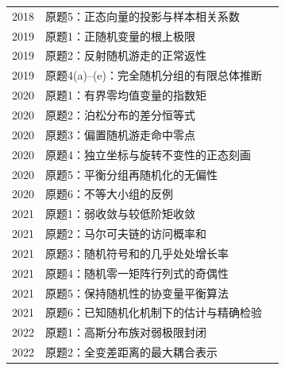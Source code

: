 \documentclass[UTF8,12pt,a4paper,fontset=fandol]{ctexbook}
\begin{document}
\begin{longtable}{@{}p{12mm}p{81mm}r@{}}
2018 & 原题5：正态向量的投影与样本相关系数 & \pageref{yau:2018-5}\\

2019 & 原题1：正随机变量的根上极限 & \pageref{yau:2019-1}\\

2019 & 原题2：反射随机游走的正常返性 & \pageref{yau:2019-2}\\

2019 & 原题4(a)--(e)：完全随机分组的有限总体推断 & \pageref{yau:2019-4}\\

2020 & 原题1：有界零均值变量的指数矩 & \pageref{yau:2020-1}\\

2020 & 原题2：泊松分布的差分恒等式 & \pageref{yau:2020-2}\\

2020 & 原题3：偏置随机游走命中零点 & \pageref{yau:2020-3}\\

2020 & 原题4：独立坐标与旋转不变性的正态刻画 & \pageref{yau:2020-4}\\

2020 & 原题5：平衡分组再随机化的无偏性 & \pageref{yau:2020-5}\\

2020 & 原题6：不等大小组的反例 & \pageref{yau:2020-6}\\

2021 & 原题1：弱收敛与较低阶矩收敛 & \pageref{yau:2021-1}\\

2021 & 原题2：马尔可夫链的访问概率和 & \pageref{yau:2021-2}\\

2021 & 原题3：随机符号和的几乎处处增长率 & \pageref{yau:2021-3}\\

2021 & 原题4：随机零一矩阵行列式的奇偶性 & \pageref{yau:2021-4}\\

2021 & 原题5：保持随机性的协变量平衡算法 & \pageref{yau:2021-5}\\

2021 & 原题6：已知随机化机制下的估计与精确检验 & \pageref{yau:2021-6}\\

2022 & 原题1：高斯分布族对弱极限封闭 & \pageref{yau:2022-1}\\

2022 & 原题2：全变差距离的最大耦合表示 & \pageref{yau:2022-2}\\


\end{longtable}
\end{document}
